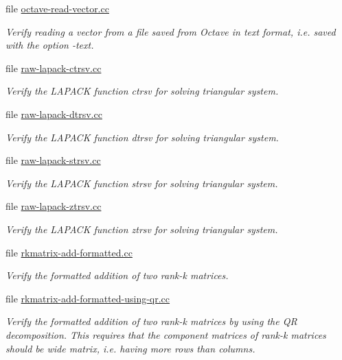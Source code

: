 \begin{DoxyCompactItemize}
file \hyperlink{octave-read-vector_8cc}{octave-\/read-\/vector.\+cc}
\begin{DoxyCompactList}\small\item\em Verify reading a vector from a file saved from Octave in text format, i.\+e. saved with the option {\ttfamily -\/text}. \end{DoxyCompactList}\item 
file \hyperlink{raw-lapack-ctrsv_8cc}{raw-\/lapack-\/ctrsv.\+cc}
\begin{DoxyCompactList}\small\item\em Verify the L\+A\+P\+A\+CK function {\ttfamily ctrsv} for solving triangular system. \end{DoxyCompactList}\item 
file \hyperlink{raw-lapack-dtrsv_8cc}{raw-\/lapack-\/dtrsv.\+cc}
\begin{DoxyCompactList}\small\item\em Verify the L\+A\+P\+A\+CK function {\ttfamily dtrsv} for solving triangular system. \end{DoxyCompactList}\item 
file \hyperlink{raw-lapack-strsv_8cc}{raw-\/lapack-\/strsv.\+cc}
\begin{DoxyCompactList}\small\item\em Verify the L\+A\+P\+A\+CK function {\ttfamily strsv} for solving triangular system. \end{DoxyCompactList}\item 
file \hyperlink{raw-lapack-ztrsv_8cc}{raw-\/lapack-\/ztrsv.\+cc}
\begin{DoxyCompactList}\small\item\em Verify the L\+A\+P\+A\+CK function {\ttfamily ztrsv} for solving triangular system. \end{DoxyCompactList}\item 
file \hyperlink{rkmatrix-add-formatted_8cc}{rkmatrix-\/add-\/formatted.\+cc}
\begin{DoxyCompactList}\small\item\em Verify the formatted addition of two rank-\/k matrices. \end{DoxyCompactList}\item 
file \hyperlink{rkmatrix-add-formatted-using-qr_8cc}{rkmatrix-\/add-\/formatted-\/using-\/qr.\+cc}
\begin{DoxyCompactList}\small\item\em Verify the formatted addition of two rank-\/k matrices by using the QR decomposition. This requires that the component matrices of rank-\/k matrices should be wide matrix, i.\+e. having more rows than columns. \end{DoxyCompactList}\item 

\end{DoxyCompactItemize}
